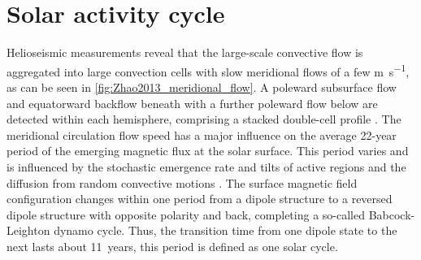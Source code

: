 \section{Solar activity cycle}
\label{sec:solar_activity_cycle}
Helioseismic measurements reveal that the large-scale convective flow is aggregated into large convection cells with slow meridional flows of a few \si{\m\per\s}, as can be seen in \autoref{fig:Zhao2013_meridional_flow}. A poleward subsurface flow and equatorward backflow beneath with a further poleward flow below are detected within each hemisphere, comprising a stacked double-cell profile \citep{Zhao2013}. The meridional circulation flow speed has a major influence on the average 22-year period of the emerging magnetic flux at the solar surface. This period varies and is influenced by the stochastic emergence rate and tilts of active regions and the diffusion from random convective motions \citep{Hathaway2016}. The surface magnetic field configuration changes within one period from a dipole structure to a reversed dipole structure with opposite polarity and back, completing a so-called Babcock-Leighton dynamo cycle. Thus, the transition time from one dipole state to the next lasts about 11~years, this period is defined as one solar cycle.

